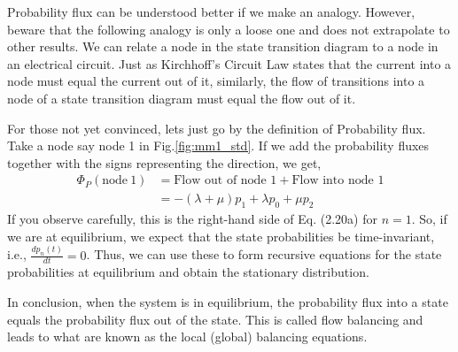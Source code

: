 \documentclass[11pt, a4paper]{report}
\begin{document}
Probability flux can be understood better if we make an analogy. However, beware that the following analogy is only a loose one and does not extrapolate to other results. We can relate a node in the state transition diagram to a node in an electrical circuit. Just as Kirchhoff's Circuit Law states that the current into a node must equal the current out of it, similarly, the flow of transitions into a node of a state transition diagram must equal the flow out of it.

For those not yet convinced, lets just go by the definition of Probability flux. Take a node say node 1 in Fig.\ref{fig:mm1_std}. If we add the probability fluxes together with the signs representing the direction, we get,
\begin{align}
    \Phi_P(\text{node}\ 1) &= \text{Flow out of node } 1 + \text{Flow into node } 1\\
    &= -(\lambda + \mu) p_1 + \lambda p_0 + \mu p_2
\end{align}
If you observe carefully, this is the right-hand side of Eq. (2.20a) for $n = 1$. So, if we are at equilibrium, we expect that the state probabilities be time-invariant, i.e., $\frac{dp_n(t)}{dt} = 0$. Thus, we can use these to form recursive equations for the state probabilities at equilibrium and obtain the stationary distribution.

In conclusion, when the system is in equilibrium, the probability flux into a state equals the probability flux out of the state. This is called flow balancing and leads to what are known as the local (global) balancing equations.
\end{document}
